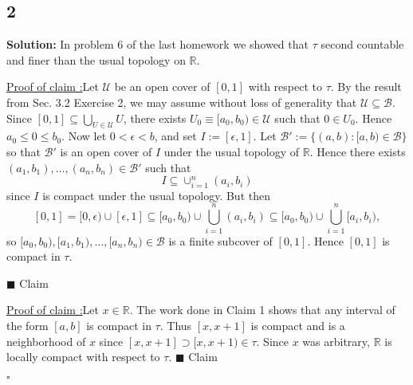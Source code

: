 \documentclass[12pt]{article}
\newcounter{ProofCounter}
\newcounter{ClaimCounter}[ProofCounter]
\newenvironment{Solution}{\stepcounter{ProofCounter}\textbf{Solution:}}{\hfill$\square$}
\newenvironment{claim}[1]{\vspace{1mm}\stepcounter{ClaimCounter}\par\noindent\underline{\bf Claim \theClaimCounter:}\space#1}{}
\newenvironment{claimproof}[1]{\par\noindent\underline{Proof of claim \theClaimCounter:}\space#1}{\hfill $\blacksquare$ Claim \theClaimCounter}
\begin{document}
\subsection*{2}
\begin{Solution}
  In problem 6 of the last homework we showed that $\tau$ second countable and finer than the usual topology on $\mathbb{R}$.

  \begin{claimproof}
    Let $\mathcal{U}$ be an open cover of $[0,1]$ with respect to $\tau$.
    By the result from Sec. 3.2 Exercise 2, we may assume without loss of generality that $\mathcal{U} \subseteq \mathcal{B}$.
    Since $[0,1] \subseteq \bigcup_{U \in \mathcal{U}}U$, there exists $U_0 \equiv [a_0,b_0) \in \mathcal{U}$ such that $0 \in U_0$. Hence $a_0 \leq 0 \leq
    b_0$. Now let $0 < \epsilon < b$, and set $I := [\epsilon, 1]$. Let $\mathcal{B}' := \{(a,b) : [a,b) \in \mathcal{B}\}$ so that $\mathcal{B}'$ is
    an open cover of $I$ under the usual topology of $\mathbb{R}$. Hence there exists $(a_1, b_1), \dots, (a_n, b_n) \in \mathcal{B}'$ such that 
    \[
      I \subseteq \cup_{i=1}^{n}(a_i, b_i)
    \]
    since $I$ is compact under the usual topology. But then 
    \[
      [0,1] = [0,\epsilon) \cup [\epsilon, 1] \subseteq [a_0, b_0) \cup \bigcup_{i=1}^{n}(a_i, b_i) \subseteq [a_0, b_0) \cup \bigcup_{i=1}^{n}[a_i,
      b_i),
    \]
    so $[a_0, b_0), [a_1, b_1), \dots, [a_n, b_n) \in \mathcal{B}$ is a finite subcover of $[0,1]$. Hence $[0,1]$ is compact in $\tau$.

  \end{claimproof}

  \begin{claimproof}
    Let $x \in \mathbb{R}$. The work done in Claim 1 shows that any interval of the form $[a,b]$ is compact in $\tau$. Thus $[x,x+1]$ is compact and
    is a neighborhood of $x$ since $[x,x+1]\supset [x,x+1) \in \tau$.
    Since $x$ was arbitrary, $\mathbb{R}$ is locally compact with respect to $\tau$.
  \end{claimproof}

\end{Solution}
\end{document}
